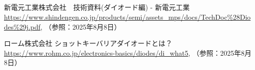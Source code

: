 \begin{center}
	\section*{}                      %
	\vspace*{-2zh}
\end{center}

\begin{thebibliography}{99}
	

新電元工業株式会社　技術資料(ダイオード編) - 新電元工業
\url{https://www.shindengen.co.jp/products/semi/assets_mps/docs/TechDoc%28Diodes%29j.pdf}, 
（参照：2025年8月8日）

ローム株式会社
ショットキーバリアダイオードとは？ 
\url{https://www.rohm.co.jp/electronics-basics/diodes/di_what5}, 
（参照：2025年8月8日）
\end{thebibliography}
